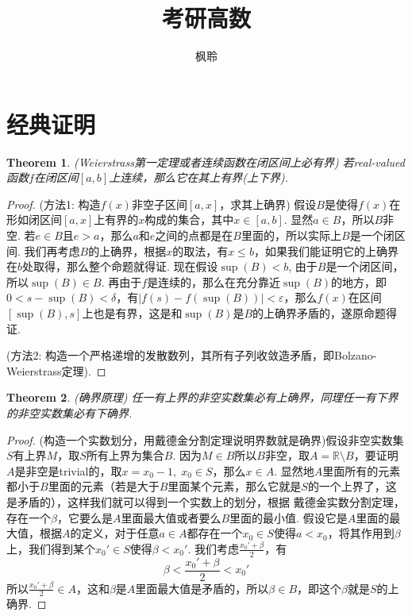 \documentclass{article}
\newtheorem{theorem}{Theorem}[section]
\begin{document}
\title{考研高数}
\author{枫聆}
\maketitle
\tableofcontents

\newpage
\section{经典证明}
\begin{theorem}
\rm {\color{red} (Weierstrass第一定理或者连续函数在闭区间上必有界)} 若real-valued函数$f$在闭区间$[a,b]$上连续，那么它在其上有界(上下界).
\end{theorem}

\begin{proof}
{\color{blue} (方法1: 构造$f(x)$非空子区间$[a,x]$，求其上确界)} 假设$B$是使得$f(x)$在形如闭区间$[a,x]$上有界的$x$构成的集合，其中$x \in [a,b]$. 显然$a \in B$，所以$B$非空. 若$e \in B$且$e > a$，那么$a$和$e$之间的点都是在$B$里面的，所以实际上$B$是一个闭区间. 我们再考虑$B$的上确界，根据$x$的取法，有$x \leq b$，如果我们能证明它的上确界在$b$处取得，那么整个命题就得证. 现在假设$\sup(B) < b$, 由于$B$是一个闭区间，所以$\sup(B) \in B$. 再由于$f$是连续的，那么在充分靠近$\sup(B)$的地方，即$ 0 < s -\sup(B) < \delta$，有$|f(s) - f(\sup(B))| < \varepsilon$，那么$f(x)$在区间$[\sup(B),s]$上也是有界，这是和$\sup(B)$是$B$的上确界矛盾的，遂原命题得证.

{\color{blue} (方法2: 构造一个严格递增的发散数列，其所有子列收敛造矛盾，即Bolzano-Weierstrass定理)}.
\end{proof}

\begin{theorem}
\rm {\color{red} (确界原理)} 任一有上界的非空实数集必有上确界，同理任一有下界的非空实数集必有下确界.
\end{theorem}

\begin{proof}
{\color{blue} (构造一个实数划分，用戴德金分割定理说明界数就是确界)}假设非空实数集$S$有上界$M$，取$S$所有上界为集合$B$. 因为$M \in B$所以$B$非空，取$A = \mathbb{R} \setminus B$，要证明$A$是非空是trivial的，取$x = x_0 - 1,\; x_0 \in S$，那么$x \in A$. 显然地$A$里面所有的元素都小于$B$里面的元素（若是大于$B$里面某个元素，那么它就是$S$的一个上界了，这是矛盾的），这样我们就可以得到一个实数上的划分，根据{\color{red} 戴德金实数分割定理}，存在一个$\beta$，它要么是$A$里面最大值或者要么$B$里面的最小值. 假设它是$A$里面的最大值，根据$A$的定义，对于任意$a \in A$都存在一个$x_0 \in S$使得$a < x_0$，将其作用到$\beta$上，我们得到某个$x_0' \in S$使得$\beta < x_0'$. 我们考虑$\frac{x_0'+\beta}{2}$，有
$$
\beta < \frac{x_0' + \beta}{2} < x_0'
$$
所以$\frac{x_0' + \beta}{2} \in A$，这和$\beta$是$A$里面最大值是矛盾的，所以$\beta \in B$，即这个$\beta$就是$S$的上确界.
\end{proof}
\end{document}
